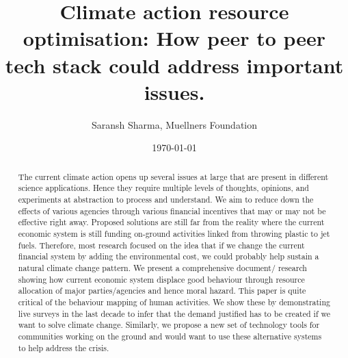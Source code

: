 \documentclass[11pt]{article}
\title{ Climate action resource optimisation: How peer to peer tech stack could address important issues. }
\author{ Saransh Sharma, Muellners Foundation }
\date{\today}
\begin{document}
\maketitle
\begin{abstract}

The current climate action opens up several issues at large that are present in different science applications. Hence they require multiple levels of thoughts, opinions, and experiments at abstraction to process and understand. We aim to reduce down the effects of various agencies through various financial incentives that may or may not be effective right away. Proposed solutions are still far from the reality where the current economic system is still funding on-ground activities linked from throwing plastic to jet fuels. Therefore, most research focused on the idea that if we change the current financial system by adding the environmental cost, we could probably help sustain a natural climate change pattern. We present a comprehensive document/ research showing how current economic system displace good behaviour through resource allocation of major parties/agencies and hence moral hazard. This paper is quite critical of the behaviour mapping of human activities. We show these by demonstrating live surveys in the last decade to infer that the demand justified has to be created if we want to solve climate change. Similarly, we propose a new set of technology tools for communities working on the ground and would want to use these alternative systems to help address the crisis.


\end{abstract} 
\end{document}
